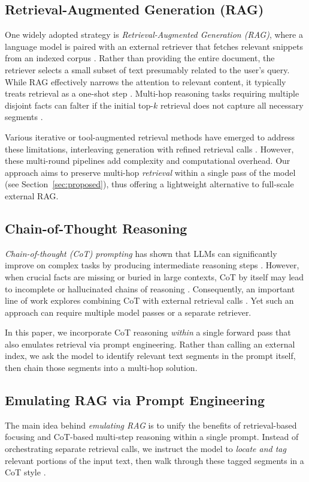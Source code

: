 \subsection{Retrieval-Augmented Generation (RAG)}
\label{subsec:rag}
One widely adopted strategy is \emph{Retrieval-Augmented Generation (RAG)}, where a language model is paired with an external retriever that fetches relevant snippets from an indexed corpus \citep{lee2024can, reddy-etal-2024-docfinqa}. Rather than providing the entire document, the retriever selects a small subset of text presumably related to the user's query. While RAG effectively narrows the attention to relevant content, it typically treats retrieval as a one-shot step \citep{bai-etal-2024-longbench}. Multi-hop reasoning tasks requiring multiple disjoint facts can falter if the initial top-$k$ retrieval does not capture all necessary segments \citep{li2024needlebench}.

Various iterative or tool-augmented retrieval methods have emerged to address these limitations, interleaving generation with refined retrieval calls \citep{lee2024can}. However, these multi-round pipelines add complexity and computational overhead. Our approach aims to preserve multi-hop \emph{retrieval} within a single pass of the model (see Section~\ref{sec:proposed}), thus offering a lightweight alternative to full-scale external RAG.

\subsection{Chain-of-Thought Reasoning}
\label{subsec:cot}
\emph{Chain-of-thought (CoT) prompting} has shown that LLMs can significantly improve on complex tasks by producing intermediate reasoning steps \citep{wei2022chain}. However, when crucial facts are missing or buried in large contexts, CoT by itself may lead to incomplete or hallucinated chains of reasoning \citep{agarwal2024manyshot}. Consequently, an important line of work explores combining CoT with external retrieval calls \citep{shaham2022scrolls, lee2024can}. Yet such an approach can require multiple model passes or a separate retriever.

In this paper, we incorporate CoT reasoning \emph{within} a single forward pass that also emulates retrieval via prompt engineering. Rather than calling an external index, we ask the model to identify relevant text segments in the prompt itself, then chain those segments into a multi-hop solution.

\subsection{Emulating RAG via Prompt Engineering}
\label{subsec:emulating_rag}
The main idea behind \emph{emulating RAG} is to unify the benefits of retrieval-based focusing and CoT-based multi-step reasoning within a single prompt. Instead of orchestrating separate retrieval calls, we instruct the model to \emph{locate and tag} relevant portions of the input text, then walk through these tagged segments in a CoT style \citep{li2024needlebench}.

